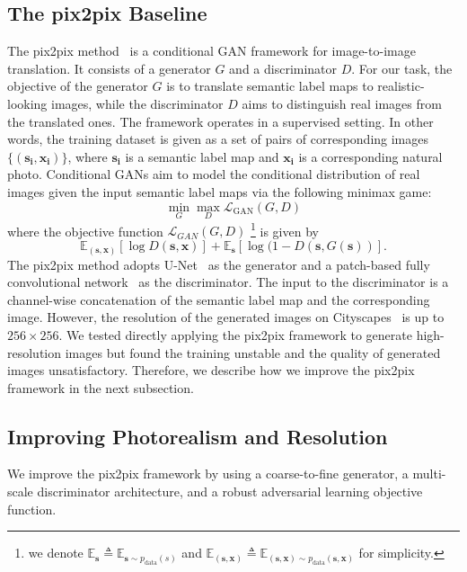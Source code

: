 \documentclass[10pt,twocolumn,letterpaper]{article}
\newcommand{\lblsec}[1]{\label{sec:#1}}
\newcommand{\pp}{pix2pix\xspace}
\newcommand{\s}{\mathbf{s}}
\newcommand{\x}{\mathbf{x}}
\begin{document}
\subsection{The pix2pix Baseline} \lblsec{alg:pix2pix}
The \pp method~\cite{isola2016image} is a conditional GAN framework for image-to-image translation. It consists of a generator $G$ and a discriminator $D$. For our task, the objective of the generator $G$ is to translate semantic label maps to realistic-looking images, while the discriminator $D$ aims to distinguish real images from the translated ones. The framework operates in a supervised setting. In other words, the training dataset is given as a set of pairs of corresponding images $\{(\mathbf{s_i},\mathbf{x_i})\}$, where $\mathbf{s_i}$ is a semantic label map and $\mathbf{x_i}$ is a corresponding natural photo. Conditional GANs aim to model the conditional distribution of real images given the input semantic label maps via the following minimax game: 
\begin{equation}
\min_{G} \max_{D} \mathcal{L}_{\text{GAN}}(G,D)
\label{eqn::minimax}
\end{equation}
where the objective function $\mathcal{L}_{GAN}(G,D)$
\footnote{we denote $\mathbb{E}_{\s} \triangleq \mathbb{E}_{\s\sim p_{\text{data}}(s)}$ and $ \mathbb{E}_{(\s,\x)} \triangleq \mathbb{E}_{(\s,\x) \sim p_{\text{data}}(\s, \x)}$ for simplicity.}
 is given by 
\begin{equation}
\mathbb{E}_{(\s,\x)}[\log D(\s,\x)]+ 
\mathbb{E}_{\s}[\log (1- D(\s,G(\s))].
\label{eqn::gan_problem}
\end{equation}
The \pp method adopts U-Net~\cite{ronneberger2015u} as the generator and a patch-based fully convolutional network~\cite{long2015fully} as the discriminator. The input to the discriminator is a channel-wise concatenation of the semantic label map and the corresponding image. 
However, the resolution of the generated images on Cityscapes~\cite{Cordts2016cityscapes} is up to $256\times 256$. We tested directly applying the \pp framework to generate high-resolution images but found the training unstable and the quality of generated images unsatisfactory. Therefore, we describe how we improve the \pp framework in the next subsection.

\subsection{Improving Photorealism and Resolution} \lblsec{alg:resolution}
We improve the \pp framework by using a coarse-to-fine generator, a multi-scale discriminator architecture, and a robust adversarial learning objective function.
\end{document}
